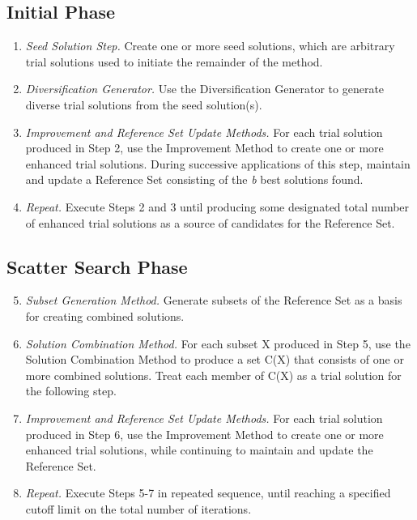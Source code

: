 \subsection{Initial Phase}
\begin{enumerate}
\item \textit{Seed Solution Step.}
  Create one or more seed solutions,
  which are
  arbitrary trial solutions
  used to
  initiate
  the remainder of the method.
\item \textit{Diversification Generator.}
  Use the Diversification Generator
  to generate
  diverse trial solutions
  from the seed solution(s).
\item \textit{Improvement and Reference Set Update Methods.}
  For each trial solution
  produced in Step 2,
  use the Improvement Method
  to create one or more enhanced trial solutions.
  During successive applications of this step,
  maintain and update
  a Reference Set
  consisting of the \textit{b} best solutions found.
\item \textit{Repeat.}
  Execute Steps 2 and 3
  until
  producing some designated
  total number of enhanced trial solutions
  as a source of candidates
  for the Reference Set.
\end{enumerate}

\subsection{Scatter Search Phase}
\begin{enumerate}
  \setcounter{enumi}{4}
\item \textit{Subset Generation Method.}
  Generate subsets of the Reference Set
  as a basis for creating combined solutions.
\item \textit{Solution Combination Method.}
  For each subset X produced in Step 5,
  use the Solution Combination Method
  to produce a set C(X)
  that consists
  of one or more combined solutions.
  Treat each member of C(X)
  as a trial solution
  for the following step.
\item \textit{Improvement and Reference Set Update Methods.}
  For each trial solution produced in Step 6,
  use the Improvement Method
  to create one or more enhanced trial solutions,
  while continuing
  to maintain and update the Reference Set.
\item \textit{Repeat.}
  Execute Steps 5-7 in repeated sequence,
  until
  reaching a specified cutoff limit
  on the total number of iterations.
\end{enumerate}
